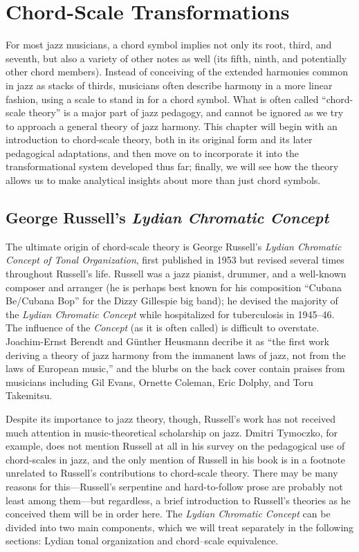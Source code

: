 
\chapter{Chord-Scale Transformations}
\label{chap:chord-scale-transformations}

For most jazz musicians, a chord symbol implies not only its root, third, and
seventh, but also a variety of other notes as well (its fifth, ninth, and
potentially other chord members). Instead of conceiving of the extended
harmonies common in jazz as stacks of thirds, musicians often describe harmony
in a more linear fashion, using a scale to stand in for a chord symbol. What
is often called ``chord-scale theory'' is a major part of jazz pedagogy, and
cannot be ignored as we try to approach a general theory of jazz harmony. This
chapter will begin with an introduction to chord-scale theory, both in its
original form and its later pedagogical adaptations, and then move on to
incorporate it into the transformational system developed thus far; finally,
we will see how the theory allows us to make analytical insights about more
than just chord symbols.

\section{George Russell’s \emph{Lydian Chromatic Concept}}
\label{sec:lcc}

The ultimate origin of chord-scale theory is George Russell's \emph{Lydian
  Chromatic Concept of Tonal Organization}, first published in 1953 but
revised several times throughout Russell's life. Russell was a jazz
pianist, drummer, and a well-known composer and arranger (he is perhaps best
known for his composition ``Cubana Be/Cubana Bop'' for the Dizzy Gillespie big
band); he devised the majority of the \emph{Lydian Chromatic Concept} while
hospitalized for tuberculosis in 1945--46. The influence of the
\emph{Concept} (as it is often called) is difficult to overstate.
Joachim-Ernst Berendt and Günther Heusmann decribe it as ``the first work
deriving a theory of jazz harmony from the immanent laws of jazz, not from the
laws of European music,'' and the blurbs on the back cover contain praises
from musicians including Gil Evans, Ornette Coleman, Eric Dolphy, and Toru
Takemitsu.

Despite its importance to jazz theory, though, Russell's work has not received
much attention in music-theoretical scholarship on jazz. Dmitri Tymoczko, for
example, does not mention Russell at all in his survey on the pedagogical use
of chord-scales in jazz, and the only mention of Russell in his book is in a
footnote unrelated to Russell's contributions to chord-scale theory.
There may be many reasons for this---Russell's serpentine and hard-to-follow
prose are probably not least among them---but regardless, a brief introduction
to Russell's theories as he conceived them will be in order here. The
\emph{Lydian Chromatic Concept} can be divided into two main components, which
we will treat separately in the following sections: Lydian tonal organization and
chord--scale equivalence.

